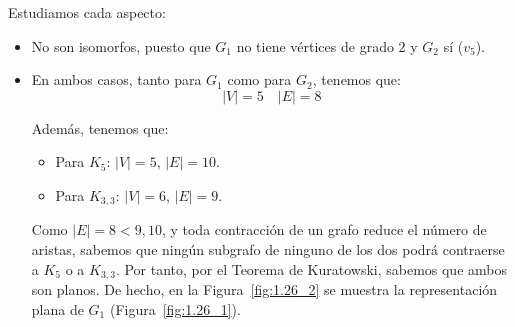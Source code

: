 \begin{ejercicio}
\begin{enumerate}
        Estudiamos cada aspecto:
        \begin{itemize}
            \item No son isomorfos, puesto que $G_1$ no tiene vértices de grado $2$ y $G_2$ sí ($v_5$).
            \item En ambos casos, tanto para $G_1$ como para $G_2$, tenemos que:
            \begin{equation*}
                |V|=5\quad |E|=8
            \end{equation*}

            Además, tenemos que:
            \begin{itemize}
                \item Para $K_5$: $|V|=5$, $|E|=10$.
                \item Para $K_{3,3}$: $|V|=6$, $|E|=9$.
            \end{itemize}

            Como $|E|=8<9,10$, y toda contracción de un grafo reduce el número de aristas, sabemos que ningún subgrafo de ninguno de los dos podrá contraerse a $K_5$ o a $K_{3,3}$. Por tanto, por el Teorema de Kuratowski, sabemos que ambos son planos. De hecho, en la Figura~\ref{fig:1.26_2} se muestra la representación plana de $G_1$ (Figura~\ref{fig:1.26_1}).
            \begin{figure}
                \centering
\end{figure}
\end{itemize}
\end{enumerate}
\end{ejercicio}
